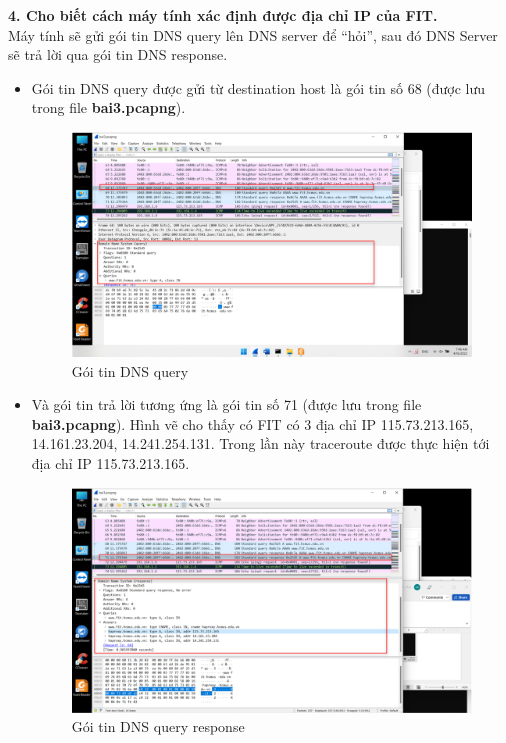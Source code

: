 \textbf{4.	Cho biết cách máy tính xác định được địa chỉ IP của FIT.}\\
Máy tính sẽ gửi gói tin DNS query lên DNS server để “hỏi”, sau đó DNS Server sẽ trả lời qua gói tin DNS response. 
\begin{itemize}
\item Gói tin DNS query được gửi từ destination host là gói tin số 68 (được lưu trong file \textbf{bai3.pcapng}).
\begin{figure}[H]
\begin{center}
\includegraphics[scale=.8]{../figures/p3/p3_dns1}
\end{center}
\caption{Gói tin DNS query}
\end{figure}
\item Và gói tin trả lời tương ứng là gói tin số 71 (được lưu trong file \textbf{bai3.pcapng}). Hình vẽ cho thấy có FIT có 3 địa chỉ IP 115.73.213.165, 14.161.23.204, 14.241.254.131. Trong lần này traceroute được thực hiện tới địa chỉ IP 115.73.213.165. 
\begin{figure}[H]
\begin{center}
\includegraphics[scale=.8]{../figures/p3/p3_dns2}
\end{center}
\caption{Gói tin DNS query response}
\end{figure}
\end{itemize}
